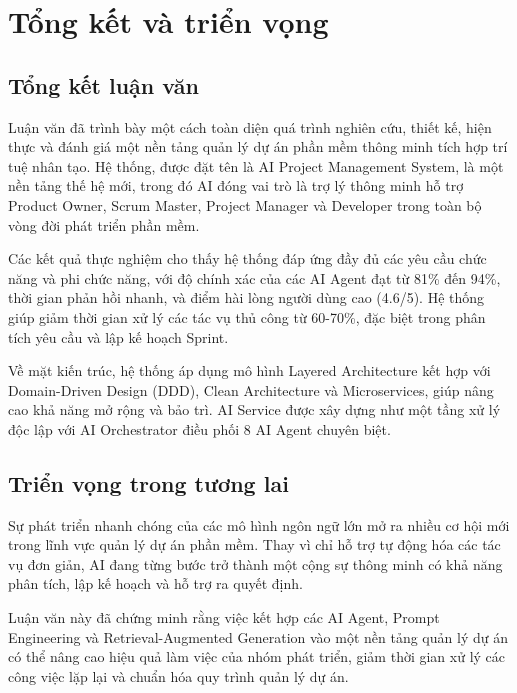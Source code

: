 \documentclass[12pt,a4paper]{report}
\begin{document}
\section{Tổng kết và triển vọng}

\subsection{Tổng kết luận văn}

Luận văn đã trình bày một cách toàn diện quá trình nghiên cứu, thiết kế, hiện thực và đánh giá một nền tảng quản lý dự án phần mềm thông minh tích hợp trí tuệ nhân tạo. Hệ thống, được đặt tên là AI Project Management System, là một nền tảng thế hệ mới, trong đó AI đóng vai trò là trợ lý thông minh hỗ trợ Product Owner, Scrum Master, Project Manager và Developer trong toàn bộ vòng đời phát triển phần mềm.

Các kết quả thực nghiệm cho thấy hệ thống đáp ứng đầy đủ các yêu cầu chức năng và phi chức năng, với độ chính xác của các AI Agent đạt từ 81\% đến 94\%, thời gian phản hồi nhanh, và điểm hài lòng người dùng cao (4.6/5). Hệ thống giúp giảm thời gian xử lý các tác vụ thủ công từ 60-70\%, đặc biệt trong phân tích yêu cầu và lập kế hoạch Sprint.

Về mặt kiến trúc, hệ thống áp dụng mô hình Layered Architecture kết hợp với Domain-Driven Design (DDD), Clean Architecture và Microservices, giúp nâng cao khả năng mở rộng và bảo trì. AI Service được xây dựng như một tầng xử lý độc lập với AI Orchestrator điều phối 8 AI Agent chuyên biệt.

\subsection{Triển vọng trong tương lai}

Sự phát triển nhanh chóng của các mô hình ngôn ngữ lớn mở ra nhiều cơ hội mới trong lĩnh vực quản lý dự án phần mềm. Thay vì chỉ hỗ trợ tự động hóa các tác vụ đơn giản, AI đang từng bước trở thành một cộng sự thông minh có khả năng phân tích, lập kế hoạch và hỗ trợ ra quyết định.

Luận văn này đã chứng minh rằng việc kết hợp các AI Agent, Prompt Engineering và Retrieval-Augmented Generation vào một nền tảng quản lý dự án có thể nâng cao hiệu quả làm việc của nhóm phát triển, giảm thời gian xử lý các công việc lặp lại và chuẩn hóa quy trình quản lý dự án.
\end{document}

